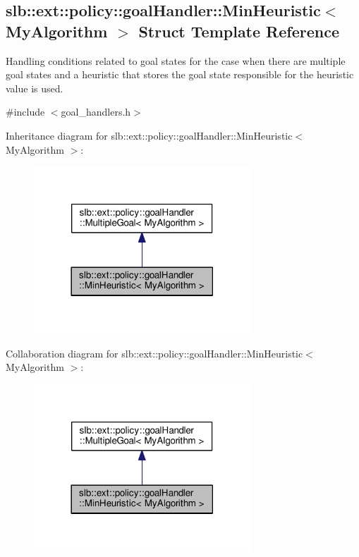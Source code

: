 \hypertarget{structslb_1_1ext_1_1policy_1_1goalHandler_1_1MinHeuristic}{}\subsection{slb\+:\+:ext\+:\+:policy\+:\+:goal\+Handler\+:\+:Min\+Heuristic$<$ My\+Algorithm $>$ Struct Template Reference}
\label{structslb_1_1ext_1_1policy_1_1goalHandler_1_1MinHeuristic}


Handling conditions related to goal states for the case when there are multiple goal states and a heuristic that stores the goal state responsible for the heuristic value is used.  




{\ttfamily \#include $<$goal\+\_\+handlers.\+h$>$}



Inheritance diagram for slb\+:\+:ext\+:\+:policy\+:\+:goal\+Handler\+:\+:Min\+Heuristic$<$ My\+Algorithm $>$\+:\nopagebreak
\begin{figure}[H]
\begin{center}
\leavevmode
\includegraphics[width=230pt]{structslb_1_1ext_1_1policy_1_1goalHandler_1_1MinHeuristic__inherit__graph}
\end{center}
\end{figure}


Collaboration diagram for slb\+:\+:ext\+:\+:policy\+:\+:goal\+Handler\+:\+:Min\+Heuristic$<$ My\+Algorithm $>$\+:\nopagebreak
\begin{figure}[H]
\begin{center}
\leavevmode
\includegraphics[width=230pt]{structslb_1_1ext_1_1policy_1_1goalHandler_1_1MinHeuristic__coll__graph}
\end{center}
\end{figure}

